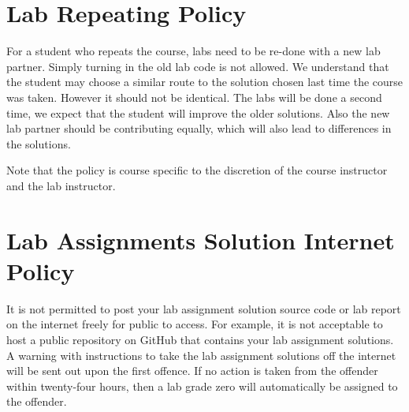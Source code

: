 \section*{Lab Repeating Policy}
For a student who repeats the course, labs need to be re-done with a new lab partner. 
Simply turning in the old lab code is not allowed. 
We understand that the student may choose a similar route to the solution chosen last time 
the course was taken. However it should not be identical. The labs will be done a second time,
we expect that the student will improve the older solutions. Also the new lab partner should be 
contributing equally, which will also lead to differences in the solutions. 

Note that the policy is course specific to the discretion of the course instructor and the lab instructor.

\section*{Lab Assignments Solution Internet Policy} 
It is not permitted to post your lab assignment solution source code or lab report on the internet freely for public to access. For example, it is not acceptable to host a public repository on GitHub that contains your lab assignment solutions. A warning with instructions to take the lab assignment solutions off the internet will be sent out upon the first offence. If no action is taken from the offender within twenty-four hours, then a lab grade zero will automatically be assigned to the offender.
    
